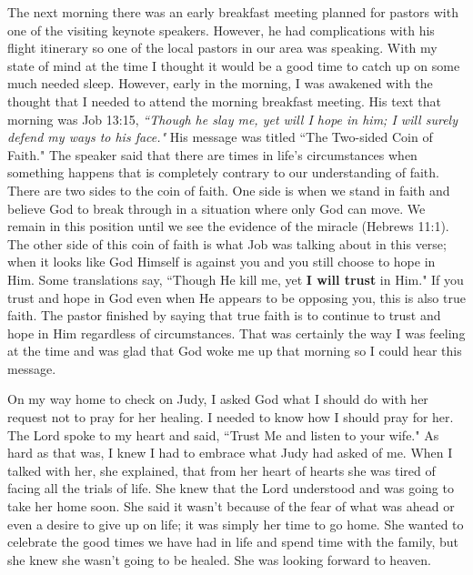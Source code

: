 \documentclass[oneside]{book}
\begin{document}
The next morning there was an early breakfast meeting planned for pastors with one of the visiting keynote speakers. However, he had complications with his flight itinerary so one of the local pastors in our area was speaking. With my state of mind at the time I thought it would be a good time to catch up on some much needed sleep. However, early in the morning, I was awakened with the thought that I needed to attend the morning breakfast meeting. His text that morning was Job 13:15, \textit{``Though he slay me, yet will I hope in him; I will surely defend my ways to his face."} His message was titled ``The Two-sided Coin of Faith." The speaker said that there are times in life's circumstances when something happens that is completely contrary to our understanding of faith. There are two sides to the coin of faith. One side is when we stand in faith and believe God to break through in a situation where only God can move. We remain in this position until we see the evidence of the miracle (Hebrews 11:1). The other side of this coin of faith is what Job was talking about in this verse; when it looks like God Himself is against you and you still choose to hope in Him. Some translations say, ``Though He kill me, yet \textbf{I will trust} in Him." If you trust and hope in God even when He appears to be opposing you, this is also true faith. The pastor finished by saying that true faith is to continue to trust and hope in Him regardless of circumstances. That was certainly the way I was feeling at the time and was glad that God woke me up that morning so I could hear this message.

On my way home to check on Judy, I asked God what I should do with her request not to pray for her healing. I needed to know how I should pray for her. The Lord spoke to my heart and said, ``Trust Me and listen to your wife." As hard as that was, I knew I had to embrace what Judy had asked of me. When I talked with her, she explained, that from her heart of hearts she was tired of facing all the trials of life. She knew that the Lord understood and was going to take her home soon. She said it wasn't because of the fear of what was ahead or even a desire to give up on life; it was simply her time to go home. She wanted to celebrate the good times we have had in life and spend time with the family, but she knew she wasn't going to be healed. She was looking forward to heaven. 
\end{document}
